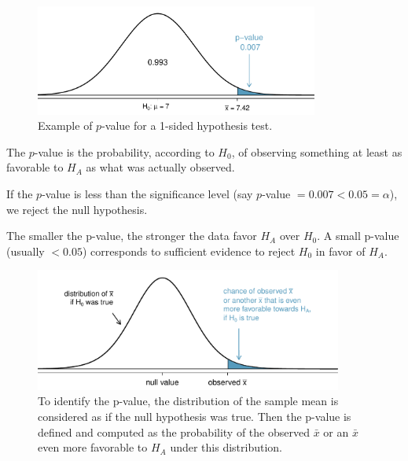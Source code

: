\begin{figure}%
   \centering
   \includegraphics[width=0.83\textwidth]{ch_inference_foundations/figures/pValueOneSidedSleepStudy/pValueOneSidedSleepStudy}
   \caption{Example of $p$-value for a 1-sided hypothesis test.}
   \label{pValueOneSidedSleepStudy}
\end{figure}

The $p$-value is the probability, according to $H_0$, of observing something at least as favorable to $H_A$ as what was actually observed.

If the $p$-value is less than the significance level (say $p$-value $=0.007 < 0.05=\alpha$), we reject the null hypothesis.

\begin{termBox}{
The smaller the p-value, the stronger the data favor $H_A$ over $H_0$. A small p-value (usually $<0.05$) corresponds to sufficient evidence to reject $H_0$ in favor of $H_A$.}
\end{termBox}


\begin{figure}%
   \centering
   \includegraphics[width=0.9\textwidth]{ch_inference_foundations/figures/pValueOneSidedSleepStudyExplained/pValueOneSidedSleepStudyExplained}
   \caption{To identify the p-value, the distribution of the sample mean is considered as if the null hypothesis was true. Then the p-value is defined and computed as the probability of the observed $\bar{x}$ or an $\bar{x}$ even more favorable to $H_A$ under this distribution.}
   \label{pValueOneSidedSleepStudyExplained}
\end{figure}

